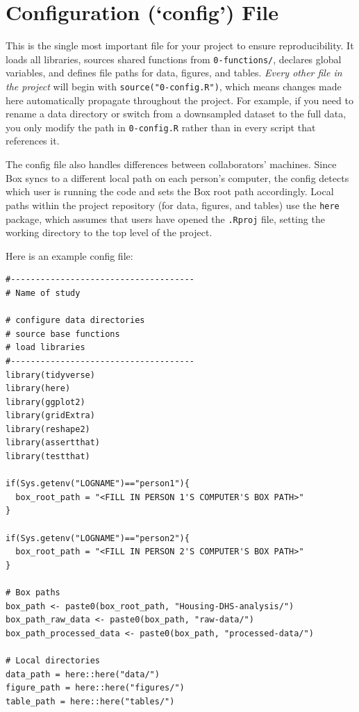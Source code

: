 \documentclass[
]{book}
\begin{document}
\section{Configuration (`config') File}\label{configuration-config-file}

This is the single most important file for your project to ensure reproducibility. It loads all libraries, sources shared functions from \texttt{0-functions/}, declares global variables, and defines file paths for data, figures, and tables. \emph{Every other file in the project} will begin with \texttt{source("0-config.R")}, which means changes made here automatically propagate throughout the project. For example, if you need to rename a data directory or switch from a downsampled dataset to the full data, you only modify the path in \texttt{0-config.R} rather than in every script that references it.

The config file also handles differences between collaborators' machines. Since Box syncs to a different local path on each person's computer, the config detects which user is running the code and sets the Box root path accordingly. Local paths within the project repository (for data, figures, and tables) use the \texttt{here} package, which assumes that users have opened the \texttt{.Rproj} file, setting the working directory to the top level of the project.

Here is an example config file:

\begin{verbatim}
#-------------------------------------
# Name of study 

# configure data directories
# source base functions
# load libraries
#-------------------------------------
library(tidyverse)
library(here)
library(ggplot2)
library(gridExtra)
library(reshape2)
library(assertthat)
library(testthat)

if(Sys.getenv("LOGNAME")=="person1"){
  box_root_path = "<FILL IN PERSON 1'S COMPUTER'S BOX PATH>"
}

if(Sys.getenv("LOGNAME")=="person2"){
  box_root_path = "<FILL IN PERSON 2'S COMPUTER'S BOX PATH>"
}

# Box paths
box_path <- paste0(box_root_path, "Housing-DHS-analysis/")
box_path_raw_data <- paste0(box_path, "raw-data/")
box_path_processed_data <- paste0(box_path, "processed-data/")

# Local directories
data_path = here::here("data/")
figure_path = here::here("figures/")
table_path = here::here("tables/")
\end{verbatim}
\end{document}
